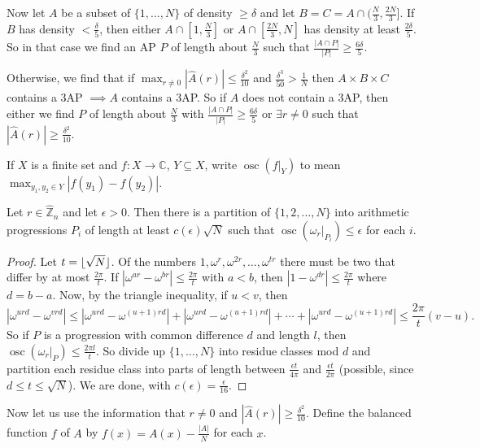 \documentclass{article}
\newcommand{\1}[1]{\mathbbm{1}_{#1}}
\DeclarePairedDelimiter\floor{\lfloor}{\rfloor}
\DeclareMathOperator{\osc}{osc}
\begin{document}
Now let $A$ be a subset of $\{1, \dotsc, N\}$ of density $\geq \delta$ and let $B = C = A \cap (\frac{N}{3}, \frac{2N}{3}]$.
If $B$ has density $< \frac{\delta}{5}$, then either $A \cap [1, \frac{N}{3}]$ or $A \cap [\frac{2N}{3}, N]$ has density at least $\frac{2 \delta}{5}$.
So in that case we find an AP $P$ of length about $\frac{N}{3}$ such that $\frac{|A \cap P|}{|P|} \geq \frac{6 \delta}{5}$.

Otherwise, we find that if $\max_{r \neq 0} |\hat{A}(r)| \leq \frac{\delta^2}{10}$ and $\frac{\delta^3}{50} > \frac{1}{N}$ then $A \times B \times C$ contains a 3AP $\implies A$ contains a 3AP.
So if $A$ does not contain a 3AP, then either we find $P$ of length about $\frac{N}{3}$ with $\frac{|A \cap P|}{|P|} \geq \frac{6 \delta}{5}$ or $\exists r \neq 0$ such that $|\hat{A}(r)| \geq \frac{\delta^2}{10}$.

\begin{defi}
  If $X$ is a finite set and $f: X \to \mathbb{C}$, $Y \subseteq X$, write $\osc(f|_Y)$ to mean $\max_{y_1, y_2 \in Y} |f(y_1) - f(y_2)|$.
\end{defi}
\begin{nlemma}\label{lem:1.6}
  Let $r \in \hat{\mathbb{Z}}_n$ and let $\epsilon > 0$. Then there is a partition of $\{1,2,\dotsc,N\}$ into arithmetic progressions $P_i$ of length at least $c(\epsilon) \sqrt{N}$ such that $\osc(\omega_r|_{P_i}) \leq \epsilon$ for each $i$.
\end{nlemma}
\begin{proof}
  Let $t = \floor{\sqrt{N}}$. Of the numbers $1, \omega^r, \omega^{2r}, \dotsc, \omega^{tr}$ there must be two that differ by at most $\frac{2\pi}{t}$.
  If $|\omega^{ar} - \omega^{br}| \leq \frac{2\pi}{t}$ with $a < b$, then $|1 - \omega^{dr}| \leq \frac{2\pi}{t}$ where $d = b-a$.
  Now, by the triangle inequality, if $u < v$, then
  \begin{equation*}
    |\omega^{u rd} - \omega^{v r d}| \leq |\omega^{urd} - \omega^{(u+1) r d}| + |\omega^{urd} - \omega^{(u+1) r d}| + \dotsb + |\omega^{urd} - \omega^{(u+1) r d}| \leq \frac{2\pi}{t} (v-u).
  \end{equation*}
  So if $P$ is a progression with common difference $d$ and length $l$, then $\osc(\omega_r|_P) \leq \frac{2\pi l}{t}$.
  So divide up $\{1,\dotsc,N\}$ into residue classes mod $d$ and partition each residue class into parts of length between $\frac{\epsilon t}{4 \pi}$ and $\frac{\epsilon t}{2 \pi}$ (possible, since $d \leq t \leq \sqrt{N}$).
  We are done, with $c(\epsilon) = \frac{\epsilon}{16}$.
\end{proof}
Now let us use the information that $r \neq 0$ and $|\hat{A}(r)| \geq \frac{\delta^2}{10}$.
Define the balanced function $f$ of $A$ by $f(x) = A(x) - \frac{|A|}{N}$ for each $x$.
\end{document}
